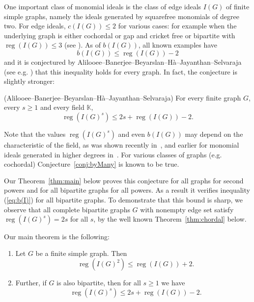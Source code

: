 \documentclass[ALCO,published]{cedram}
\numberwithin{equation}{section}
\newcommand \reg{\operatorname{reg}}
\newcommand \K{\mathbb{K}}
\begin{document}
 One important class of monomial ideals is the class of edge ideals $I(G)$ of finite simple graphs, namely the ideals generated by squarefree monomials of degree two. For edge ideals, $c(I(G))\le 2$ for various cases: for example when the underlying graph is either cochordal or gap and cricket free or bipartite with $\reg(I(G))\leq 3$
 (see \cite{banerjee1,banerjee,BBH17,froberg}). %
 As of $b(I(G))$, all known examples have
 \begin{equation}\label{eq:b(I)}
b(I(G))\leq \reg(I(G))-2
 \end{equation}
 and it is conjectured by Alilooee--Banerjee--Beyarslan--H\`a--Jayanthan--Selvaraja (see e.g. \cite{BBH17,JS18}) that this inequality holds for every graph.  In fact, the conjecture is
slightly stronger:
\begin{conj}\label{conj:byMany}\textup{(Alilooee--Banerjee--Beyarslan--H\`a--Jayanthan--Selvaraja)}
For every finite graph $G$, every $s\geq 1$ and every field $\K$,  $$\reg(I(G)^s)\leq 2s+ \reg(I(G))-2.$$
\end{conj}
Note that the values $\reg(I(G)^s)$ and even $b(I(G))$ may depend on the characteristic of the field, as was shown recently in~\cite[Exa. 1.2]{minh_vu}, and earlier for monomial ideals generated in higher degrees in~\cite{machia}.
For various classes of graphs (e.g. cochordal)
 Conjecture~\ref{conj:byMany} is known to be true.

  Our Theorem~\ref{thm:main} below proves this conjecture for all graphs for second powers and for all bipartite graphs for all powers. As a result it verifies inequality (\ref{eq:b(I)}) for all bipartite graphs.
 To demonstrate that this bound is sharp, we observe that all complete bipartite graphs $G$ with nonempty edge set satisfy $\reg(I(G)^s)=2s$ for all $s$, by the well known Theorem~\ref{thm:chordal} below.


 Our main theorem is the following:
\begin{theorem}
\begin{enumerate}[label=(\roman*)]
\item \label{it:1} Let $G$ be a finite simple graph. Then
$$ \text{ }\reg(I(G)^2) \leq \reg (I(G))+2.$$
\item \label{it:2} Further, if $G$ is also bipartite, then for all $s\geq 1$ we have $$\text{ } \reg(I(G)^s) \leq 2s+\reg (I(G))-2.$$
\end{enumerate}
\label{thm:main}
\end{theorem}
\end{document}
